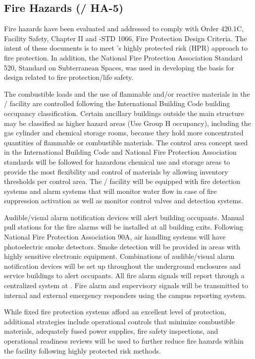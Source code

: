 \subsection{Fire Hazards (/ HA-5)}

Fire hazards have been evaluated and addressed to comply with
 Order 420.1C, Facility Safety, Chapter II and
-STD 1066, Fire Protection Design Criteria.  The intent of
these documents is to meet 's highly protected risk (HPR)
approach to fire protection.  In addition, the National Fire
Protection Association Standard 520, Standard on Subterranean Spaces,
was used in developing the basis for design related to fire
protection/life safety.

The combustible loads and the use of flammable and/or reactive
materials in the / facility are controlled
following the International Building Code building occupancy
classification. Certain ancillary buildings outside the main structure
may be classified as higher hazard areas (Use Group H occupancy),
including the gas cylinder and chemical storage rooms, because they
hold more concentrated quantities of flammable or combustible
materials.  The control area concept used in the International
Building Code and National Fire Protection Association standards will
be followed for hazardous chemical use and storage areas to provide
the most flexibility and control of materials by allowing inventory
thresholds per control area.  The / facility
will be equipped with fire detection systems and alarm systems that
will monitor water flow in case of fire suppression activation as well
as monitor control valves and detection systems.

Audible/visual alarm notification devices will alert building
occupants.  Manual pull stations for the fire alarms will be installed
at all building exits.  Following National Fire Protection Association
90A, air handling systems will have photoelectric smoke detectors.
Smoke detection will be provided in areas with highly sensitive
electronic equipment.  Combinations of audible/visual alarm
notification devices will be set up throughout the underground
enclosures and service buildings to alert occupants. All fire alarm
signals will report through a centralized system at .
Fire alarm and supervisory signals will be transmitted to internal and
external emergency responders using the campus reporting system.

While fixed fire protection systems afford an excellent level
of protection, additional strategies include operational controls
that minimize combustible materials, adequately
fused power supplies, fire safety inspections, and operational
readiness reviews will be used to further reduce fire hazards
within the facility following  highly protected risk methods.

